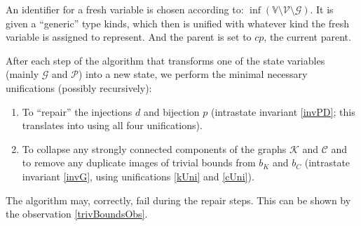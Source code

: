 \begin{defn}
    \label{freshVar}
    An identifier for a fresh variable is chosen according to: \linebreak $\inf \left(\mathbb{V} \setminus \mathcal{V} \setminus \mathcal{G}\right)$. It is given a ``generic'' type kinds, which then is unified with whatever kind the fresh variable is assigned to represent. And the parent is set to $cp$, the current parent.
\end{defn}

\begin{defn}
    \label{middlesteps}

    After each step of the algorithm that transforms one of the state variables (mainly $\mathcal{G}$ and $\mathcal{P}$) into a new state, we perform the minimal necessary unifications (possibly recursively):

    \begin{enumerate}
        \item To ``repair'' the injections $d$ and bijection $p$ (intrastate invariant \ref{invPD}; this translates into using all four unifications).

        \item To collapse any strongly connected components of the graphs $\mathcal{K}$ and  $\mathcal{C}$ and to remove any duplicate images of trivial bounds from $b_K$ and $b_C$ (intrastate invariant \ref{invG}, using unifications \ref{kUni} and \ref{cUni}).
    \end{enumerate}
\end{defn}

\begin{remark}
    The algorithm may, correctly, fail during the repair steps. This can be shown by the observation \ref{trivBoundsObs}.
\end{remark}


